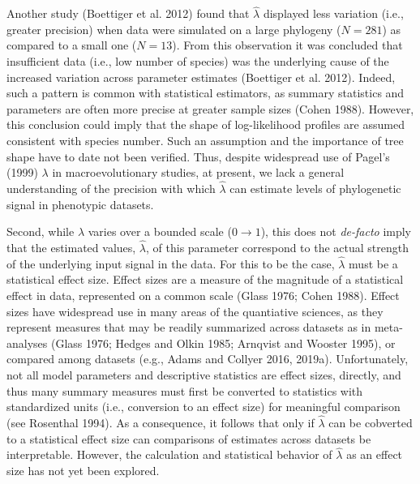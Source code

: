\documentclass[
]{article}
\begin{document}
Another study (Boettiger et al. 2012) found that \(\hat{\lambda}\)
displayed less variation (i.e., greater precision) when data were
simulated on a large phylogeny (\(N=281\)) as compared to a small one
(\(N=13\)). From this observation it was concluded that insufficient
data (i.e., low number of species) was the underlying cause of the
increased variation across parameter estimates (Boettiger et al. 2012).
Indeed, such a pattern is common with statistical estimators, as summary
statistics and parameters are often more precise at greater sample sizes
(Cohen 1988). However, this conclusion could imply that the shape of
log-likelihood profiles are assumed consistent with species number. Such
an assumption and the importance of tree shape have to date not been
verified. Thus, despite widespread use of Pagel's (1999) \(\lambda\) in
macroevolutionary studies, at present, we lack a general understanding
of the precision with which \(\hat{\lambda}\) can estimate levels of
phylogenetic signal in phenotypic datasets. \hfill\break

Second, while \(\lambda\) varies over a bounded scale (\(0\to1\)), this
does not \emph{de-facto} imply that the estimated values,
\(\hat{\lambda}\), of this parameter correspond to the actual strength
of the underlying input signal in the data. For this to be the case,
\(\hat{\lambda}\) must be a statistical effect size. Effect sizes are a
measure of the magnitude of a statistical effect in data, represented on
a common scale (Glass 1976; Cohen 1988). Effect sizes have widespread
use in many areas of the quantiative sciences, as they represent
measures that may be readily summarized across datasets as in
meta-analyses (Glass 1976; Hedges and Olkin 1985; Arnqvist and Wooster
1995), or compared among datasets (e.g., Adams and Collyer 2016, 2019a).
Unfortunately, not all model parameters and descriptive statistics are
effect sizes, directly, and thus many summary measures must first be
converted to statistics with standardized units (i.e., conversion to an
effect size) for meaningful comparison (see Rosenthal 1994). As a
consequence, it follows that only if \(\hat{\lambda}\) can be cobverted
to a statistical effect size can comparisons of estimates across
datasets be interpretable. However, the calculation and statistical
behavior of \(\hat{\lambda}\) as an effect size has not yet been
explored. \hfill\break
\end{document}
